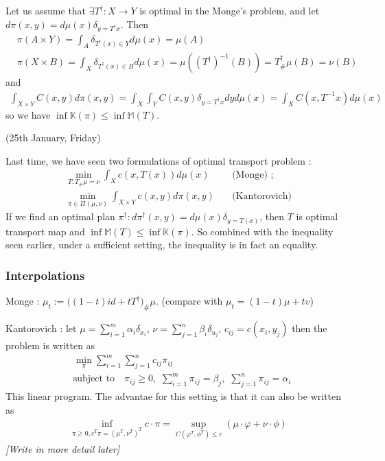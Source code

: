 \documentclass[12pt,a4paper]{article}
\begin{document}
\quad Let us assume that $\exists T^{\dagger} : X\rightarrow Y$ is optimal in the Monge's problem, and let $d\pi(x,y) = d\mu(x) \delta_{y = T^{\dagger} x}$. Then
\begin{align*}
& \pi(A \times Y) = \int_A \delta_{T^{\dagger}(x) \in Y} d\mu(x) = \mu(A) \\
& \pi(X\times B) = \int_X \delta_{T^{\dagger}(x)\in B} d\mu(x) = \mu((T^{\dagger})^{-1}(B)) = T_{\#}^{\dagger} \mu(B) = \nu(B)
\end{align*}
and
\begin{align*}
\int_{X\times Y}C(x,y) d\pi(x,y) = \int_X \int_Y C(x,y) \delta_{y = T^{\dagger}x} dy d\mu(x) = \int_X C(x,T^{-1}x) d\mu(x)  
\end{align*}
so we have $\inf \mathbb{K}(\pi) \leq \inf \mathbb{M}(T)$.
\s

\newday

(25th January, Friday)
\s

Last time, we have seen two formulations of optimal transport problem :
\begin{align*}
\min_{T : T_{\#}\mu =\nu} \int_X c(x, T(x))d\mu(x) &\quad \text{(Monge)}\,\, ; \\
\min_{\pi \in \Pi(\mu, \nu)} \int_{X\times Y} c(x,y) d\pi(x,y) &\quad \text{(Kantorovich)}
\end{align*}
If we find an optimal plan $\pi^{\dagger} : d\pi^{\dagger}(x,y) = d\mu(x) \delta_{y= T(x)}$, then $T$ is optimal transport map and $\inf \mathbb{M}(T) \leq \inf \mathbb{K}(\pi)$. So combined with the inequality seen earlier, under a sufficient setting, the inequality is in fact an equality.
\s

\subsubsection*{Interpolations}

Monge : $\mu_t := \Big( (1-t)id + tT^{\dagger} \Big)_{\#} \mu$. (compare with $\mu_t = (1-t)\mu + tv$)

Kantorovich : let $\mu =\sum_{i=1}^m \alpha_i \delta_{x_i}$, $\nu =\sum_{j=1}^n \beta_i \delta_{u_j}$, $c_{ij} = c(x_i, y_j)$ then the problem is written as
\begin{align*}
& \min_{\pi} \sum_{i=1}^m \sum_{j=1}^n c_{ij} \pi_{ij} \\
& \text{subject to} \quad \pi_{ij} \geq 0, \,\,\sum_{i=1}^m \pi_{ij} =\beta_j,\,\, \sum_{j=1}^n \pi_{ij} = \alpha_i
\end{align*}
This linear program. The advantae for this setting is that it can also be written as
\begin{align*}
\inf_{\pi \geq 0, c^T \pi = (\mu^T, \nu^T)^T} c\cdot\pi = \sup_{C(\varphi^T, \phi^T)\leq c}(\mu \cdot \varphi + \nu \cdot \phi)
\end{align*}
\emph{[Write in more detail later]}
\end{document}
